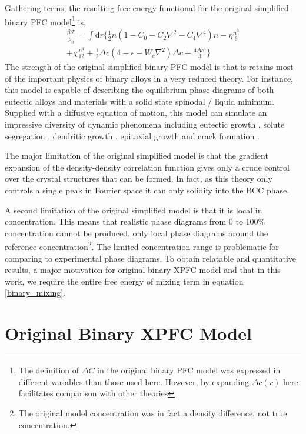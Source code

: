 \documentclass[showkeys, prb, reprint]{revtex4-1}
\newcommand{\F}{\mathcal{F}}    %
\renewcommand{\l}{\left}        %
\renewcommand{\r}{\right}       %
\newcommand{\f}{\frac}          %
\newcommand{\integrate}[1]{\int\!\mathrm{d}#1}
\begin{document}
Gathering terms, the resulting free energy functional for the original
simplified binary PFC model\footnote{The definition of $\Delta C$ in the original 
binary PFC model was expressed in different variables than those used here. However, by expanding $\Delta c(r)$ here facilitates comparison with other theories} is,
%
\begin{multline}
    \f{\beta\F}{\rho_0} = \integrate{r} \Bigg\{ 
        \f{1}{2} n\l( 1 - C_0 - C_2 \nabla^2 - C_4\nabla^4 \r) n  
    - \eta\f{n^3}{6} \\+ \chi\f{n^4}{12}
    + \f{1}{2} \Delta c\l( 4 - \epsilon - W_c\nabla^2 \r) \Delta c
    + \f{4 \Delta c^4}{3} \Bigg\} 
\end{multline}
%
The strength of the original simplified binary PFC model is that is retains
most of the important physics of binary alloys in a very reduced theory. For
instance, this  model is capable of describing the equilibrium phase
diagrams of both eutectic alloys and materials with a solid state spinodal /
liquid minimum.  Supplied with a diffusive equation of motion, this 
model can simulate an impressive diversity of dynamic phenomena including eutectic
growth \cite{ELDER07}, solute segregation \cite{STOLLE14}, dendritic growth
\cite{ELDER07}, epitaxial growth \cite{ELDER10_NANOISLAND, LU16} and crack
formation \cite{HU17}.

The major limitation of the original simplified model is that the gradient
expansion of the density-density correlation function gives only a crude
control over the crystal structures that can be formed. In fact, as this theory
only controls a single peak in Fourier space it can only solidify into the BCC
phase.

A second limitation of the original simplified model is that it is local in
concentration. This means that realistic phase diagrams from 0 to 100\%
concentration cannot be produced, only local phase diagrams around the
reference concentration\footnote{The original model concentration was
in fact a density difference, not true concentration.}. The limited
concentration range is problematic for comparing to experimental phase
diagrams. To obtain relatable and quantitative results, a major motivation for
original binary XPFC model and that in this work, we require the entire
 free energy of mixing term in equation \ref{binary_mixing}.

\section{Original Binary XPFC Model} %
\end{document}
